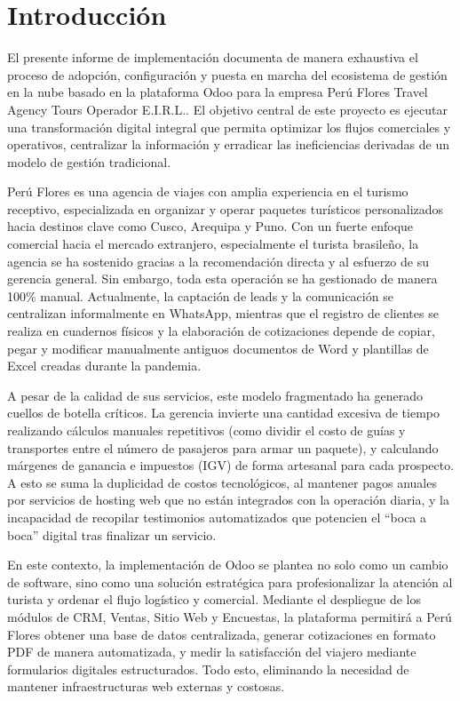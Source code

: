 \section{Introducción}
El presente informe de implementación documenta de manera exhaustiva el proceso de adopción, configuración y puesta en marcha del ecosistema de gestión en la nube basado en la plataforma Odoo para la empresa Perú Flores Travel Agency Tours Operador E.I.R.L.. El objetivo central de este proyecto es ejecutar una transformación digital integral que permita optimizar los flujos comerciales y operativos, centralizar la información y erradicar las ineficiencias derivadas de un modelo de gestión tradicional.

Perú Flores es una agencia de viajes con amplia experiencia en el turismo receptivo, especializada en organizar y operar paquetes turísticos personalizados hacia destinos clave como Cusco, Arequipa y Puno. Con un fuerte enfoque comercial hacia el mercado extranjero, especialmente el turista brasileño, la agencia se ha sostenido gracias a la recomendación directa y al esfuerzo de su gerencia general. Sin embargo, toda esta operación se ha gestionado de manera 100\% manual. Actualmente, la captación de leads y la comunicación se centralizan informalmente en WhatsApp, mientras que el registro de clientes se realiza en cuadernos físicos y la elaboración de cotizaciones depende de copiar, pegar y modificar manualmente antiguos documentos de Word y plantillas de Excel creadas durante la pandemia.

A pesar de la calidad de sus servicios, este modelo fragmentado ha generado cuellos de botella críticos. La gerencia invierte una cantidad excesiva de tiempo realizando cálculos manuales repetitivos (como dividir el costo de guías y transportes entre el número de pasajeros para armar un paquete), y calculando márgenes de ganancia e impuestos (IGV) de forma artesanal para cada prospecto. A esto se suma la duplicidad de costos tecnológicos, al mantener pagos anuales por servicios de hosting web que no están integrados con la operación diaria, y la incapacidad de recopilar testimonios automatizados que potencien el ``boca a boca'' digital tras finalizar un servicio.

En este contexto, la implementación de Odoo se plantea no solo como un cambio de software, sino como una solución estratégica para profesionalizar la atención al turista y ordenar el flujo logístico y comercial. Mediante el despliegue de los módulos de CRM, Ventas, Sitio Web y Encuestas, la plataforma permitirá a Perú Flores obtener una base de datos centralizada, generar cotizaciones en formato PDF de manera automatizada, y medir la satisfacción del viajero mediante formularios digitales estructurados. Todo esto, eliminando la necesidad de mantener infraestructuras web externas y costosas.

